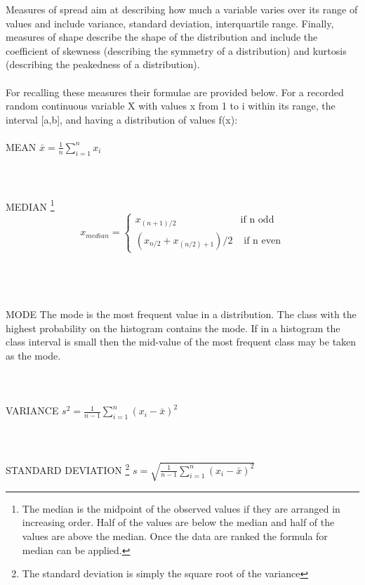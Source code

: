 \documentclass {article}
\begin{document}
Measures of spread aim at describing how much a variable varies over its range of values and include variance, standard deviation, interquartile range. 
Finally, measures of shape describe the shape of the distribution and include the coefficient of skewness (describing the symmetry of a distribution) and kurtosis (describing the peakedness of a distribution). 
\\
\\
For recalling these measures their formulae are provided below.
 For a recorded random continuous variable X with values x from 1 to i within its range, the interval [a,b], and having a distribution of values f(x):
\\
\\
MEAN \tab $\bar{x}=\frac{1}{n}\displaystyle\sum_{i=1}^{n}x_i$
\\
\\
\\
\\
MEDIAN \footnote{The median is the midpoint of the observed values if they are arranged in increasing order. Half of the values are below the median and half of the values are above the median. Once the data are ranked the formula for median can be applied.} \tab \begin{equation*}
 x_{median}= 
\begin{cases}
x_{(n+1)/2} & \text{if n odd} \\
(x_{n/2}+x_{(n/2)+1})/2 & \text{ if n even}
\end{cases} 
\end{equation*}
\\
\\
\\
\\
MODE The mode is the most frequent value in a distribution. The class with the highest probability on the histogram contains the mode. If in a histogram the class interval is small then the mid-value of the most frequent class may be taken as the mode.
\\
\\
\\
\\
VARIANCE \tab $s^2=\frac{1}{n-1}\displaystyle\sum_{i=1}^{n}(x_i-\bar{x})^2$
\\
\\
\\
\\
STANDARD DEVIATION \footnote{The standard deviation is simply the square root of the variance}
\tab  $s=\sqrt{\frac{1}{n-1}\displaystyle\sum_{i=1}^{n}(x_i-\bar{x})^2}$
\end{document}
